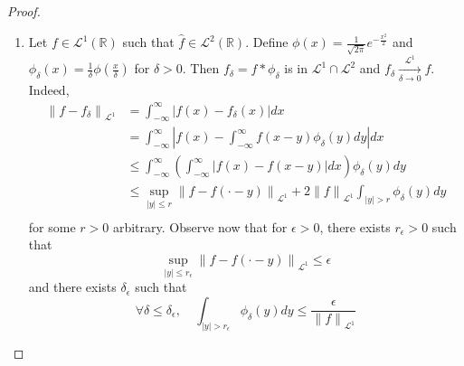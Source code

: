 \begin{proof}
  \begin{enumerate}
    \item
      Let $f \in \mathcal{L}^1(\mathbb{R})$ such that $\hat{f} \in \mathcal{L}^2(\mathbb{R})$. Define $\phi(x) = 
      \frac{1}{\sqrt{2\pi}} e^{-\frac{x^2}{2}}$ and $\phi_{\delta}(x) = \frac{1}{\delta}\phi(\frac{x}{\delta})$ for 
      $\delta > 0$. Then $f_{\delta} = f*\phi_{\delta}$ is in $\mathcal{L}^1 \cap \mathcal{L}^2$ and $f_{\delta} 
      \xrightarrow[\delta \to 0]{\mathcal{L}^1} f$. Indeed,
      \begin{align*}
	{\|f - f_{\delta}\|}_{\mathcal{L}^1} &= \int_{-\infty}^{\infty} |f(x)-f_{\delta}(x)| dx \\
	&= \int_{-\infty}^{\infty} |f(x) - \int_{-\infty}^{\infty} f(x-y) \phi_{\delta}(y) dy |dx \\
	&\leq \int_{-\infty}^{\infty} \left(\int_{-\infty}^{\infty} |f(x)-f(x-y)| dx\right) \phi_{\delta}(y)dy \\
	&\leq \sup_{|y| \leq r} {\|f-f(\cdot-y)\|}_{\mathcal{L}^1} + 2 {\|f\|}_{\mathcal{L}^1} \int_{|y| > r} 
	\phi_{\delta}(y)dy \\
      \end{align*}
      for some $r > 0$ arbitrary. Observe now that for $\epsilon > 0$, there exists $r_{\epsilon} > 0$ such that 
      \begin{equation*}
	\sup_{|y| \leq r_{\epsilon}} {\|f-f(\cdot-y)\|}_{\mathcal{L}^1} \leq \epsilon
      \end{equation*}
      and there exists $\delta_{\epsilon}$ such that 
      \begin{equation*}
	\forall \delta \leq \delta_{\epsilon}, \quad \int_{|y| > r_{\epsilon}} \phi_{\delta}(y) dy \leq  
	\frac{\epsilon}{{\|f\|}_{\mathcal{L}^1}}
      \end{equation*}
    

\end{enumerate}
\end{proof}
